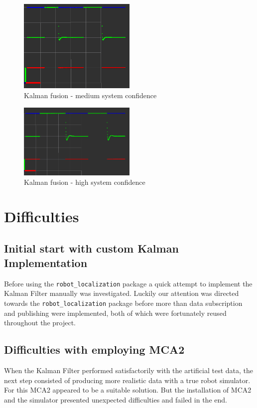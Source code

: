 \begin{figure}[thpb]
      \centering
      \includegraphics[width=0.5\textwidth]{graphics/kalman_medium.png}
      \caption{Kalman fusion - medium system confidence}
      \label{Fig: Kalman Fusion - Medium}
   \end{figure}
	
\begin{figure}[thpb]
      \centering
      \includegraphics[width=0.5\textwidth]{graphics/kalman_slow.png}
      \caption{Kalman fusion - high system confidence}
      \label{Fig: Kalman Fusion - High}
   \end{figure}

\section{Difficulties}
\subsection{Initial start with custom Kalman Implementation}
Before using the \texttt{robot\_localization} package a quick attempt to implement the Kalman Filter manually was investigated. Luckily our attention was directed towards the \texttt{robot\_localization} package before more than data subscription and publishing were implemented, both of which were fortunately reused throughout the project.

\subsection{Difficulties with employing MCA2}
When the Kalman Filter performed satisfactorily with the artificial test data, the next step consisted of producing more realistic data with a true robot simulator. For this MCA2 appeared to be a suitable solution. But the installation of MCA2 and the simulator presented unexpected difficulties and failed in the end.

